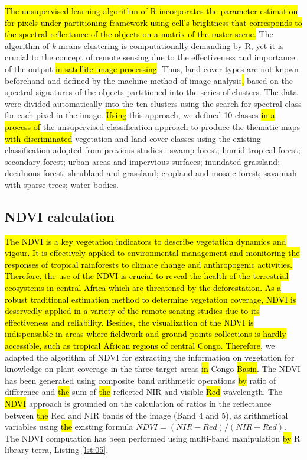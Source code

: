 \documentclass[applsci,article,submit,pdftex,moreauthors]{Definitions/mdpi}
\begin{document}
\hl{The unsupervised learning algorithm of R incorporates the parameter estimation for pixels under partitioning framework using cell's brightness that corresponds to the spectral reflectance of the objects on a matrix of the raster scene.} The algorithm of \emph{k}-means clustering is computationally demanding by R, yet it is crucial to the concept of remote sensing\hl{ }due to the effectiveness and importance of the output\hl{ in satellite image processing}. Thus, land cover types are not known beforehand and defined by the machine method of image analysis\hl{, }based on the spectral signatures of the objects partitioned into the series of clusters. The data were divided automatically into the ten clusters using the search for spectral class for each pixel in the image. 
\hl{Using }this approach, we defined 10 classes \hl{in a process of} the unsupervised classification approach to produce the thematic maps \hl{with discriminated} vegetation and land cover classes using the existing classification adopted from previous studies \cite{Bwangoy}: swamp forest; humid tropical forest; secondary forest; urban areas and impervious surfaces; inundated grassland; deciduous forest; shrubland and grassland; cropland and mosaic forest; savannah with sparse trees; water bodies. 

\subsection{NDVI calculation}
\hl{The NDVI is a key vegetation indicators to describe vegetation dynamics and vigour. It is effectively applied to environmental management and monitoring the responses of tropical rainforests to climate change and anthropogenic activities. Therefore, the use of the NDVI is crucial to reveal the health of the terrestrial ecosystems in central Africa which are threatened by the deforestation. As a robust traditional estimation method to determine vegetation coverage, NDVI is deservedly applied in a variety of the remote sensing studies due to its effectiveness and reliability. Besides, the visualization of the NDVI is indispensable in areas where fieldwork and ground points collections is hardly accessible, such as tropical African regions of central Congo. Therefore}, we adapted the algorithm of NDVI for extracting the information on vegetation for knowledge on plant coverage in the three target areas \hl{in} Congo \hl{Basin}. The NDVI has been generated using composite band arithmetic operations \hl{by} ratio of\hl{ }difference and \hl{the} sum of \hl{the} reflected NIR and visible \hl{Red} wavelength. The \hl{NDVI} approach\hl{ }is grounded on the calculation of ratios in the reflectance between \hl{the} Red and NIR bands of the image (Band 4 and 5), as arithmetical variables using \hl{the} existing formula $NDVI=(NIR-Red)/(NIR+Red)$. The NDVI computation has been performed using\hl{ }multi-band manipulation \hl{by} R library terra, Listing \ref{lst:05}. 
\end{document}
